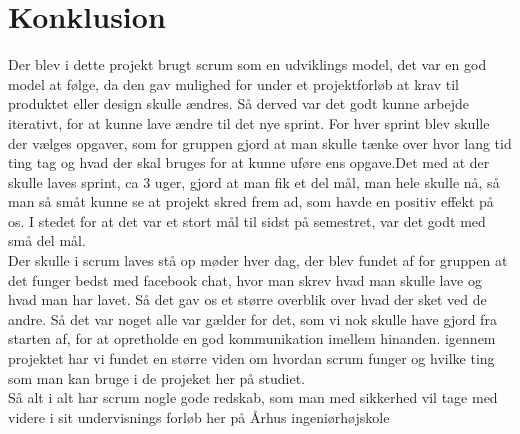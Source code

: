 \chapter{Konklusion}
Der blev i dette projekt brugt scrum som en udviklings model, det var en god model at følge, da den gav mulighed for under et projektforløb at krav til produktet eller design skulle ændres. Så derved var det godt kunne arbejde iterativt, for at kunne lave ændre til det nye sprint. For hver sprint blev skulle der vælges opgaver, som for gruppen gjord at man skulle tænke over hvor lang tid ting tag og hvad der skal bruges for at kunne uføre ens opgave.Det med at der skulle laves sprint, ca 3 uger, gjord at man fik et del mål, man hele skulle nå, så man så småt kunne se at projekt skred frem ad, som havde en positiv effekt på os. I stedet for at det var et stort mål til sidst på semestret, var det godt med små del mål. \\Der skulle i scrum laves stå op møder hver dag, der blev fundet af for gruppen at det funger bedst med facebook chat, hvor man skrev hvad man skulle lave og hvad man har lavet. Så det gav os et større overblik over hvad der sket ved de andre. Så det var noget alle var gælder for det, som vi nok skulle have gjord fra starten af, for at opretholde  en god kommunikation imellem hinanden. igennem projektet har vi fundet en større viden om hvordan scrum funger og hvilke ting som man kan bruge i de projeket her på studiet. 
\\Så alt i alt har scrum nogle gode redskab, som man med sikkerhed vil tage med videre i sit undervisnings forløb her på Århus ingeniørhøjskole 
 



 



